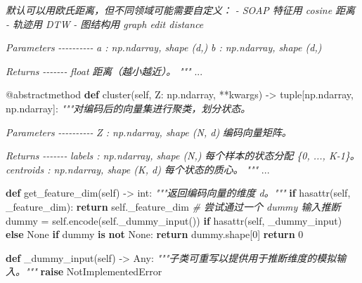 \documentclass[
  12pt,
]{ctexart}
\newenvironment{Shaded}{}{}
\newcommand{\AttributeTok}[1]{\textcolor[rgb]{0.49,0.56,0.16}{#1}}
\newcommand{\BuiltInTok}[1]{\textcolor[rgb]{0.00,0.50,0.00}{#1}}
\newcommand{\CommentTok}[1]{\textcolor[rgb]{0.38,0.63,0.69}{\textit{#1}}}
\newcommand{\ControlFlowTok}[1]{\textcolor[rgb]{0.00,0.44,0.13}{\textbf{#1}}}
\newcommand{\DecValTok}[1]{\textcolor[rgb]{0.25,0.63,0.44}{#1}}
\newcommand{\KeywordTok}[1]{\textcolor[rgb]{0.00,0.44,0.13}{\textbf{#1}}}
\newcommand{\NormalTok}[1]{#1}
\newcommand{\OperatorTok}[1]{\textcolor[rgb]{0.40,0.40,0.40}{#1}}
\newcommand{\PreprocessorTok}[1]{\textcolor[rgb]{0.74,0.48,0.00}{#1}}
\newcommand{\StringTok}[1]{\textcolor[rgb]{0.25,0.44,0.63}{#1}}
\newcommand{\VariableTok}[1]{\textcolor[rgb]{0.10,0.09,0.49}{#1}}
\begin{document}
\begin{Shaded}
\begin{Highlighting}[]
\CommentTok{        默认可以用欧氏距离，但不同领域可能需要自定义：}
\CommentTok{        {-} SOAP 特征用 cosine 距离}
\CommentTok{        {-} 轨迹用 DTW}
\CommentTok{        {-} 图结构用 graph edit distance}

\CommentTok{        Parameters}
\CommentTok{        {-}{-}{-}{-}{-}{-}{-}{-}{-}{-}}
\CommentTok{        a : np.ndarray, shape (d,)}
\CommentTok{        b : np.ndarray, shape (d,)}

\CommentTok{        Returns}
\CommentTok{        {-}{-}{-}{-}{-}{-}{-}}
\CommentTok{        float}
\CommentTok{            距离（越小越近）。}
\CommentTok{        """}
\NormalTok{        ...}

    \AttributeTok{@abstractmethod}
    \KeywordTok{def}\NormalTok{ cluster(}\VariableTok{self}\NormalTok{, Z: np.ndarray, }\OperatorTok{**}\NormalTok{kwargs) }\OperatorTok{{-}\textgreater{}} \BuiltInTok{tuple}\NormalTok{[np.ndarray, np.ndarray]:}
        \CommentTok{"""对编码后的向量集进行聚类，划分状态。}

\CommentTok{        Parameters}
\CommentTok{        {-}{-}{-}{-}{-}{-}{-}{-}{-}{-}}
\CommentTok{        Z : np.ndarray, shape (N, d)}
\CommentTok{            编码向量矩阵。}

\CommentTok{        Returns}
\CommentTok{        {-}{-}{-}{-}{-}{-}{-}}
\CommentTok{        labels : np.ndarray, shape (N,)}
\CommentTok{            每个样本的状态分配 \{0, ..., K{-}1\}。}
\CommentTok{        centroids : np.ndarray, shape (K, d)}
\CommentTok{            每个状态的质心。}
\CommentTok{        """}
\NormalTok{        ...}

    \KeywordTok{def}\NormalTok{ get\_feature\_dim(}\VariableTok{self}\NormalTok{) }\OperatorTok{{-}\textgreater{}} \BuiltInTok{int}\NormalTok{:}
        \CommentTok{"""返回编码向量的维度 d。"""}
        \ControlFlowTok{if} \BuiltInTok{hasattr}\NormalTok{(}\VariableTok{self}\NormalTok{, }\StringTok{\textquotesingle{}\_feature\_dim\textquotesingle{}}\NormalTok{):}
            \ControlFlowTok{return} \VariableTok{self}\NormalTok{.\_feature\_dim}
        \CommentTok{\# 尝试通过一个 dummy 输入推断}
\NormalTok{        dummy }\OperatorTok{=} \VariableTok{self}\NormalTok{.encode(}\VariableTok{self}\NormalTok{.\_dummy\_input()) }\ControlFlowTok{if} \BuiltInTok{hasattr}\NormalTok{(}\VariableTok{self}\NormalTok{, }\StringTok{\textquotesingle{}\_dummy\_input\textquotesingle{}}\NormalTok{) }\ControlFlowTok{else} \VariableTok{None}
        \ControlFlowTok{if}\NormalTok{ dummy }\KeywordTok{is} \KeywordTok{not} \VariableTok{None}\NormalTok{:}
            \ControlFlowTok{return}\NormalTok{ dummy.shape[}\DecValTok{0}\NormalTok{]}
        \ControlFlowTok{return} \DecValTok{0}

    \KeywordTok{def}\NormalTok{ \_dummy\_input(}\VariableTok{self}\NormalTok{) }\OperatorTok{{-}\textgreater{}}\NormalTok{ Any:}
        \CommentTok{"""子类可重写以提供用于推断维度的模拟输入。"""}
        \ControlFlowTok{raise} \PreprocessorTok{NotImplementedError}
\end{Highlighting}
\end{Shaded}
\end{document}
